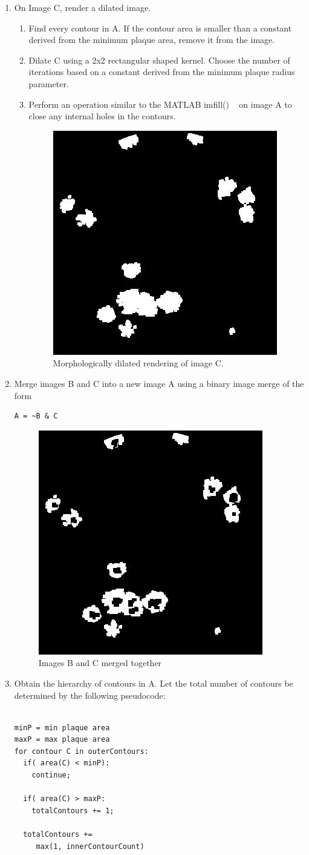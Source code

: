 \documentclass[11pt,final,twocolumn]{IEEEtran}
\begin{document}
\begin{enumerate}
\item On Image C, render a dilated image.
\begin{enumerate}
\item  Find every contour in A. If the contour area is smaller than a constant derived from the minimum plaque area, remove it from the image.
\item  Dilate C using a 2x2 rectangular shaped kernel. Choose the number of iterations based on a constant derived from the minimum plaque radius parameter.
\item  Perform an  operation similar to the MATLAB imfill() ~\cite{matlab}  on image A to close any internal holes in the contours.
\begin{figure}[H]
\centering
\includegraphics[width=.25\textwidth]{countDilateC.jpg}
\caption{Morphologically dilated rendering of image C.}
\label{fig:countDilateC}
\end{figure}
\end{enumerate}

\item
Merge images B and C into a new image A using a binary image merge of the form 
\begin{Verbatim}[samepage=true]
A = ~B & C
\end{Verbatim}
\begin{figure}[H]
\centering
\includegraphics[width=.25\textwidth]{countMerged.jpg}
\caption{Images B and C merged together}
\label{fig:countMerged}
\end{figure}

\item
Obtain the hierarchy of contours in A. Let the total number of contours be determined by the following pseudocode:
\begin{Verbatim}[samepage=true]

minP = min plaque area
maxP = max plaque area
for contour C in outerContours:
  if( area(C) < minP):
    continue;

  if( area(C) > maxP:
    totalContours += 1;

  totalContours +=
     max(1, innerContourCount) 
\end{Verbatim}

\end{enumerate}
\end{document}
